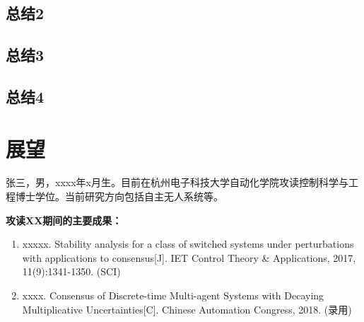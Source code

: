 \documentclass[master]{styles/hdu-thesis}
\begin{document}
\subsection{总结2}
\subsection{总结3}
\subsection{总结4}
\section{展望}










%
%

 \personalresult
 张三，男，xxxx年x月生。目前在杭州电子科技大学自动化学院攻读控制科学与工程博士学位。当前研究方向包括自主无人系统等。\\

 {\par\bfseries \noindent 攻读XX期间的主要成果：}
 \begin{enumerate}
  \item  xxxxx. \newblock Stability analysis for a class of switched systems under
perturbations with applications to consensus[J].
\newblock IET Control Theory \& Applications, 2017, 11(9):1341-1350. (SCI)
  \item xxxx.
\newblock Consensus of Discrete-time Multi-agent Systems with Decaying Multiplicative Uncertainties[C].
\newblock Chinese Automation Congress, 2018. (录用)
 \end{enumerate}




\end{document}
